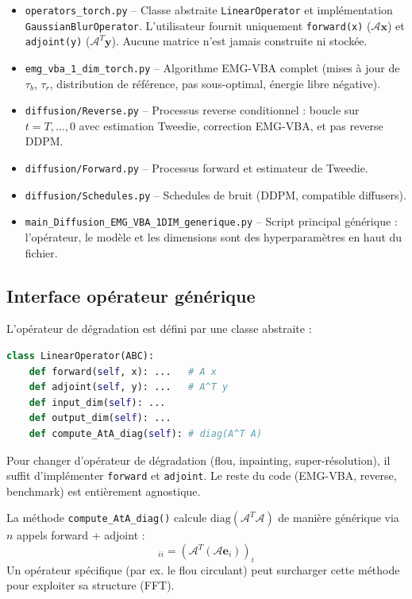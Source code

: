 \documentclass[12pt]{article}
\newcommand{\y}{\boldsymbol{y}}
\newcommand{\x}{\boldsymbol{x}}
\newcommand{\op}{\mathcal{A}}
\begin{document}
\begin{itemize}
    \item \texttt{operators\_torch.py} -- Classe abstraite \texttt{LinearOperator} et implémentation \texttt{GaussianBlurOperator}. L'utilisateur fournit uniquement \texttt{forward(x)} ($\op \x$) et \texttt{adjoint(y)} ($\op^T \y$). Aucune matrice n'est jamais construite ni stockée.
    \item \texttt{emg\_vba\_1\_dim\_torch.py} -- Algorithme EMG-VBA complet (mises à jour de $\tau_b$, $\tau_r$, distribution de référence, pas sous-optimal, énergie libre négative).
    \item \texttt{diffusion/Reverse.py} -- Processus reverse conditionnel : boucle sur $t = T, \ldots, 0$ avec estimation Tweedie, correction EMG-VBA, et pas reverse DDPM.
    \item \texttt{diffusion/Forward.py} -- Processus forward et estimateur de Tweedie.
    \item \texttt{diffusion/Schedules.py} -- Schedules de bruit (DDPM, compatible diffusers).
    \item \texttt{main\_Diffusion\_EMG\_VBA\_1DIM\_generique.py} -- Script principal générique : l'opérateur, le modèle et les dimensions sont des hyperparamètres en haut du fichier.
\end{itemize}

\subsection{Interface opérateur générique}

L'opérateur de dégradation est défini par une classe abstraite :
\begin{lstlisting}[language=Python, basicstyle=\small\ttfamily]
class LinearOperator(ABC):
    def forward(self, x): ...   # A x
    def adjoint(self, y): ...   # A^T y
    def input_dim(self): ...
    def output_dim(self): ...
    def compute_AtA_diag(self): # diag(A^T A)
\end{lstlisting}
Pour changer d'opérateur de dégradation (flou, inpainting, super-résolution), il suffit d'implémenter \texttt{forward} et \texttt{adjoint}. Le reste du code (EMG-VBA, reverse, benchmark) est entièrement agnostique.

La méthode \texttt{compute\_AtA\_diag()} calcule $\text{diag}(\op^T\op)$ de manière générique via $n$ appels forward + adjoint :
\begin{equation}
    [\op^T\op]_{ii} = (\op^T(\op \boldsymbol{e}_i))_i
\end{equation}
Un opérateur spécifique (par ex. le flou circulant) peut surcharger cette méthode pour exploiter sa structure (FFT).
\end{document}
